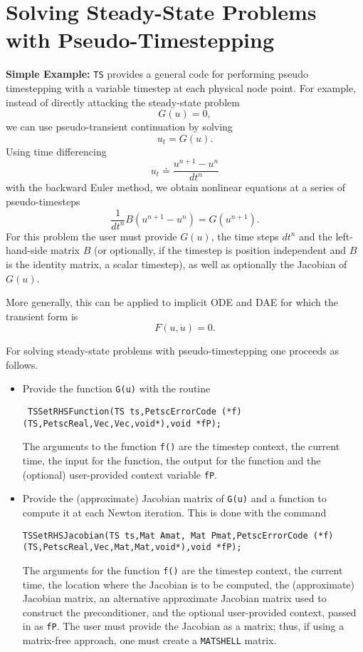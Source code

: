 {\vspace{.2cm}

\cleardoublepage
\chapter{Solving Steady-State Problems with Pseudo-Timestepping}

\vspace{.2cm}

\noindent
{\bf Simple Example:}
\lstinline{TS} provides a general code for performing pseudo timestepping
with a variable timestep at each physical node point. For example, instead of
directly attacking the steady-state problem
\[
           G(u) = 0,
\]
we can use pseudo-transient continuation by solving
\[
           u_t = G(u).
\]
Using time differencing
\[
   u_t \doteq \frac{{u^{n+1}} - {u^{n}} }{dt^{n}}
\]
with the backward Euler method, we obtain
nonlinear equations at a series of pseudo-timesteps
\[
           \frac{1}{dt^n} B (u^{n+1} - u^{n} ) = G(u^{n+1}).
\]
For this problem the user must provide $G(u)$,
the time steps $dt^{n}$ and the left-hand-side matrix $B$
(or optionally, if the timestep is position independent and $B$ is the
identity matrix,
a scalar timestep), as well as optionally the Jacobian of $G(u)$.

More generally, this can be applied to implicit ODE and DAE for which
the transient form is
\[
  F(u,\dot{u}) = 0.
\]

For solving steady-state problems with pseudo-timestepping one proceeds
as follows.
\begin{itemize}
\item Provide the function \lstinline{G(u)} with the routine
\begin{lstlisting}
 TSSetRHSFunction(TS ts,PetscErrorCode (*f)(TS,PetscReal,Vec,Vec,void*),void *fP);
\end{lstlisting}
The  arguments to the function \lstinline{f()} are
the timestep context, the current time, the input for the function,
the output for the function and the (optional) user-provided context
variable \lstinline{fP}.

\item Provide the (approximate) Jacobian matrix of \lstinline{G(u)} and a
function to compute it at each Newton iteration. This is done with the command
\begin{lstlisting}
TSSetRHSJacobian(TS ts,Mat Amat, Mat Pmat,PetscErrorCode (*f)(TS,PetscReal,Vec,Mat,Mat,void*),void *fP);
\end{lstlisting}
The  arguments for the function \lstinline{f()} are
the timestep context, the current time, the location where the
Jacobian is to be computed, the (approximate) Jacobian matrix, an alternative
approximate Jacobian matrix used to construct the preconditioner, and the optional
user-provided context, passed in as \lstinline{fP}. The user must provide the
Jacobian as a matrix; thus, if using a matrix-free approach, one
must create a \lstinline{MATSHELL} matrix.
\end{itemize}

}
